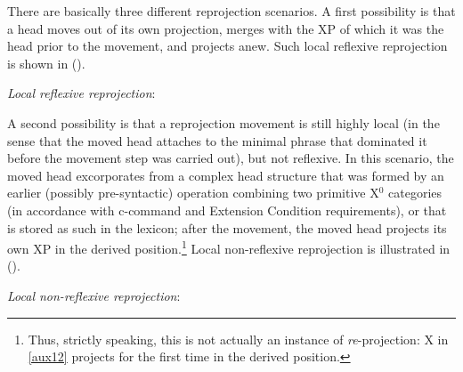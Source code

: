 \documentclass[output=paper
,modfonts
,nonflat]{langsci/langscibook}
\begin{document}
There are basically three different reprojection scenarios. A first
possibility is that a head moves out of its own projection, merges
with the XP of which it was the head prior to the movement, and
projects anew. Such local reflexive reprojection is shown in (\Next). 

\ea\label{ex:mueller:24} {\itshape Local reflexive reprojection}:\\
\z

A second possibility is that a reprojection movement is still highly
local (in the sense that the moved head attaches to the minimal phrase
that dominated it before the movement step was carried out), but not
reflexive. In this scenario, the moved head excorporates from a complex
head structure that was formed by an earlier (possibly pre-syntactic) 
operation combining two primitive X$^0$ categories (in accordance with
c-command and Extension Condition requirements), or that is stored as
such in the lexicon; after the movement, the moved head projects its own
XP in the derived position.\footnote{Thus, strictly speaking, this is
  not actually an instance of {\itshape re}-projection: X in \ref{aux12}
  projects for the first time in the derived position.} Local non-reflexive
reprojection is illustrated in (\Next). 

\ea\label{ex:mueller:25} {\itshape Local \label{aux12}non-reflexive reprojection}:\\
\z
\end{document}
